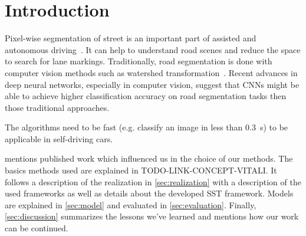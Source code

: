 
\section{Introduction}
Pixel-wise segmentation of street is an important part of assisted and
autonomous driving~\cite{Tarel2009}. It can help to understand road scenes and
reduce the space to search for lane markings. Traditionally, road segmentation
is done with computer vision methods such as watershed
transformation~\cite{Beucher1990}. Recent advances in deep neural networks,
especially in computer vision, suggest that \glspl{CNN} might be able to
achieve higher classification accuracy on road segmentation tasks then those
traditional approaches.

The algorithms need to be fast (e.g. classify an image in less than
\SI{0.3}{\second}) to be applicable in self-driving cars.

 mentions published work which influenced us in the
choice of our methods. The basics methods used are explained in
TODO-LINK-CONCEPT-VITALI. It follows a description of the realization in
\cref{sec:realization} with a description of the used frameworks as well as
details about the developed SST framework. Models are explained in
\cref{sec:model} and evaluated in \cref{sec:evaluation}. Finally,
\cref{sec:discussion} summarizes the lessons we've learned and mentions how
our work can be continued.